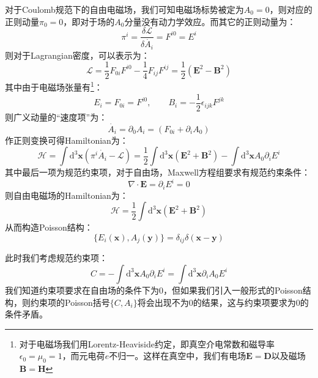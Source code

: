 对于Coulomb规范下的自由电磁场，我们可知电磁场标势被定为$A_0=0$，则对应的正则动量$\pi_0=0$，即对于场的$A_0$分量没有动力学效应。而其它的正则动量为：
\begin{equation}
\pi^i=\frac{\delta\mathcal{L}}{\delta\dot{A_{i}}}=F^{i0}=E^{i} 
\end{equation}
则对于Lagrangian密度，可以表示为：
\begin{equation}
\mathscr{L}=\frac{1}{2}F_{0i}F^{i0}-\frac{1}{4}F_{ij}F^{ij}=\frac{1}{2}(\boldsymbol{E}^2-\boldsymbol{B}^2)
\end{equation}
其中由于电磁场张量有\footnote{对于电磁场我们用Lorentz-Heaviside约定，即真空介电常数和磁导率$\epsilon_0=\mu_0=1$，而元电荷$e$不归一。这样在真空中，我们有电场$\boldsymbol{E}=\boldsymbol{D}$以及磁场$\boldsymbol{B}=\boldsymbol{H}$}：
\begin{equation}
E_{i}= F_{0i}= F^{i0},\qquad B_i=-\frac{1}{2}\epsilon_{ijk}F^{jk}
\end{equation}
则广义动量的“速度项”为：
\begin{equation}
\dot{A_i}=\partial_0A_i=(F_{0i}+\partial_iA_0)
\end{equation}
作正则变换可得Hamiltonian为：
\begin{equation}
\mathcal{H}=\int\mathrm{d}^3\boldsymbol{x}\left(\pi^i \dot{A_{i}}-\mathscr{L}\right)=\frac{1}{2}\int\mathrm{d}^3\boldsymbol{x}(\boldsymbol{E}^2+\boldsymbol{B}^2)-\int\mathrm{d}^3\boldsymbol{x}A_0\partial_i E^i
\end{equation}
其中最后一项为规范约束项，对于自由场，Maxwell方程组要求有规范约束条件：
\begin{equation}
\nabla\cdot\boldsymbol{E}=\partial_i E^i=0
\end{equation}
则自由电磁场的Hamiltonian为：
\begin{equation}
\mathcal{H}=\frac{1}{2}\int\mathrm{d}^3\boldsymbol{x}(\boldsymbol{E}^2+\boldsymbol{B}^2)
\end{equation}
从而构造Poisson结构：
\begin{equation}
\{E_i(\boldsymbol{x}),A_j(\boldsymbol{y})\}=\delta_{ij}\delta(\boldsymbol{x}-\boldsymbol{y})
\end{equation}
\par 此时我们考虑规范约束项：
\begin{equation}
C=-\int\mathrm{d}^3\boldsymbol{x}A_0\partial_i E^i=\int\mathrm{d}^3\boldsymbol{x}\partial_i A_0 E^i
\end{equation}
我们知道约束项要求在自由场的条件下为0，但如果我们引入一般形式的Poisson结构，则约束项的Poisson括号$\{C,A_i\}$将会出现不为0的结果，这与约束项要求为0的条件矛盾。
